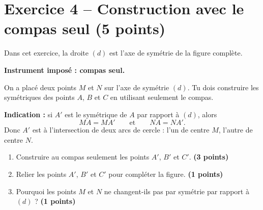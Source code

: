 \documentclass[11pt,a4paper]{article}
\newcommand{\points}[1]{\hfill \textbf{(#1 points)}}
\begin{document}
\section*{Exercice 4 -- Construction avec le compas seul \points{5}}

Dans cet exercice, la droite $(d)$ est l'axe de symétrie de la figure complète.

\medskip

\textbf{Instrument imposé : compas seul.}

\medskip

On a placé deux points $M$ et $N$ sur l'axe de symétrie $(d)$.  
Tu dois construire les symétriques des points $A$, $B$ et $C$ en utilisant seulement le compas.

\medskip

\textbf{Indication :} si $A'$ est le symétrique de $A$ par rapport à $(d)$, alors
\[
MA = MA'
\qquad \text{et} \qquad
NA = NA'.
\]
Donc $A'$ est à l'intersection de deux arcs de cercle : l'un de centre $M$, l'autre de centre $N$.

\begin{center}
\end{center}

\begin{enumerate}[label=\arabic*)]
    \item Construire au compas seulement les points $A'$, $B'$ et $C'$. \points{3}
    \item Relier les points $A'$, $B'$ et $C'$ pour compléter la figure. \points{1}
    \item Pourquoi les points $M$ et $N$ ne changent-ils pas par symétrie par rapport à $(d)$ ? \points{1}
\end{enumerate}

\vspace{0.8cm}
\end{document}

